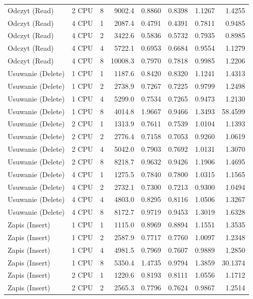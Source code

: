 \begin{table}[ht]
{\begin{tabular}{llcrrrrr}
Odczyt (Read) & 2 CPU & 8 & 9002.4 & 0.8860 & 0.8398 & 1.1267 & 1.4255 \\
Odczyt (Read) & 4 CPU & 1 & 2087.4 & 0.4791 & 0.4391 & 0.7811 & 0.9485 \\
Odczyt (Read) & 4 CPU & 2 & 3422.6 & 0.5836 & 0.5732 & 0.7935 & 0.8985 \\
Odczyt (Read) & 4 CPU & 4 & 5722.1 & 0.6953 & 0.6684 & 0.9554 & 1.1279 \\
Odczyt (Read) & 4 CPU & 8 & 10008.3 & 0.7970 & 0.7818 & 0.9985 & 1.2206 \\
Usuwanie (Delete) & 1 CPU & 1 & 1187.6 & 0.8420 & 0.8320 & 1.1241 & 1.4313 \\
Usuwanie (Delete) & 1 CPU & 2 & 2738.9 & 0.7267 & 0.7225 & 0.9799 & 1.2498 \\
Usuwanie (Delete) & 1 CPU & 4 & 5299.0 & 0.7534 & 0.7265 & 0.9473 & 1.2130 \\
Usuwanie (Delete) & 1 CPU & 8 & 4014.8 & 1.9667 & 0.9466 & 1.3493 & 58.4599 \\
Usuwanie (Delete) & 2 CPU & 1 & 1313.9 & 0.7611 & 0.7539 & 1.0104 & 1.1393 \\
Usuwanie (Delete) & 2 CPU & 2 & 2776.4 & 0.7158 & 0.7053 & 0.9260 & 1.0619 \\
Usuwanie (Delete) & 2 CPU & 4 & 5042.0 & 0.7903 & 0.7692 & 1.0131 & 1.3070 \\
Usuwanie (Delete) & 2 CPU & 8 & 8218.7 & 0.9632 & 0.9426 & 1.1906 & 1.4695 \\
Usuwanie (Delete) & 4 CPU & 1 & 1275.5 & 0.7840 & 0.7800 & 1.0315 & 1.1565 \\
Usuwanie (Delete) & 4 CPU & 2 & 2732.1 & 0.7300 & 0.7213 & 0.9300 & 1.0494 \\
Usuwanie (Delete) & 4 CPU & 4 & 4803.0 & 0.8295 & 0.8116 & 1.0506 & 1.3267 \\
Usuwanie (Delete) & 4 CPU & 8 & 8172.7 & 0.9719 & 0.9453 & 1.3019 & 1.6328 \\
Zapis (Insert) & 1 CPU & 1 & 1115.0 & 0.8969 & 0.8894 & 1.1551 & 1.3535 \\
Zapis (Insert) & 1 CPU & 2 & 2587.9 & 0.7717 & 0.7760 & 1.0097 & 1.2348 \\
Zapis (Insert) & 1 CPU & 4 & 4981.5 & 0.7969 & 0.7607 & 0.9889 & 1.2850 \\
Zapis (Insert) & 1 CPU & 8 & 5350.4 & 1.4735 & 0.9794 & 1.3859 & 30.1374 \\
Zapis (Insert) & 2 CPU & 1 & 1220.6 & 0.8193 & 0.8111 & 1.0556 & 1.1712 \\
Zapis (Insert) & 2 CPU & 2 & 2565.3 & 0.7796 & 0.7624 & 0.9867 & 1.2514 \\

\end{tabular}}
\end{table}
